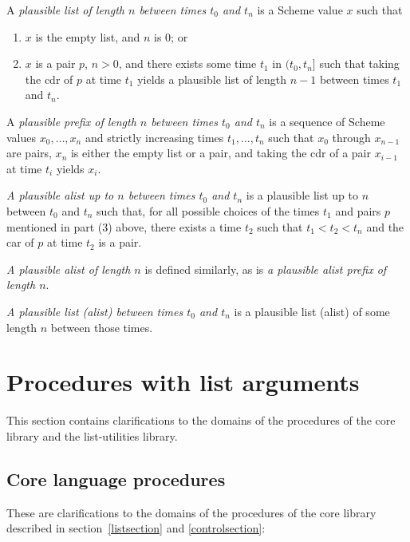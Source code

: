 A \textit{plausible list of length $n$ between times $t_0$ and $t_n$}
is a Scheme value $x$ such that

\begin{enumerate}
\item $x$ is the empty list, and $n$ is $0$; or
\item $x$ is a pair $p$, $n > 0$, and there exists some time
  $t_1$ in $(t_0,t_n]$ such that taking the cdr of $p$ at
  time $t_1$ yields a plausible list of length $n-1$
  between times $t_1$ and $t_n$.
\end{enumerate}

A \textit{plausible prefix of length $n$ between times $t_0$ and
  $t_n$} is a sequence of Scheme values $x_0,\ldots,x_n$ and strictly
increasing times $t_1,\ldots,t_n$ such that $x_0$ through $x_{n-1}$
are pairs, $x_n$ is either the empty list or a pair, and taking the
cdr of a pair $x_{i-1}$ at time $t_i$ yields $x_i$.

\textit{A plausible alist up to $n$ between times $t_0$ and $t_n$} is
a plausible list up to $n$ between $t_0$ and $t_n$ such that, for all
possible choices of the times $t_1$ and pairs $p$ mentioned in part
(3) above, there exists a time $t_2$ such that $t_1 < t_2 < t_n$ and
the car of $p$ at time $t_2$ is a pair.

\textit{A plausible alist of length $n$} is defined similarly, as is
\textit{a plausible alist prefix of length $n$}.

\textit{A plausible list (alist) between times $t_0$ and $t_n$} is a
plausible list (alist) of some length $n$ between those times.

\section{Procedures with list arguments}
\label{proceduresmutablelistargumentssection}

This section contains clarifications to the domains of the procedures of the core
library and the list-utilities library.

\subsection{Core language procedures}

These are clarifications to the domains of the procedures of the core
library described in section~\ref{listsection} and \ref{controlsection}:

\begin{entry}{%
}

\end{entry}

